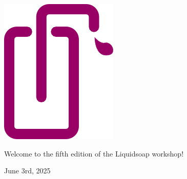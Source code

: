 \documentclass[aspectratio=169]{beamer}
\begin{document}
\begin{frame}
  \vspace{1cm}
  \begin{center}
    \includegraphics[scale=.7]{logo}

    \vspace{1cm}

    {\Large
      Welcome to the fifth edition of the Liquidsoap workshop!
    }

    \bigskip

    June 3rd, 2025
  \end{center}
\end{frame}
\end{document}
